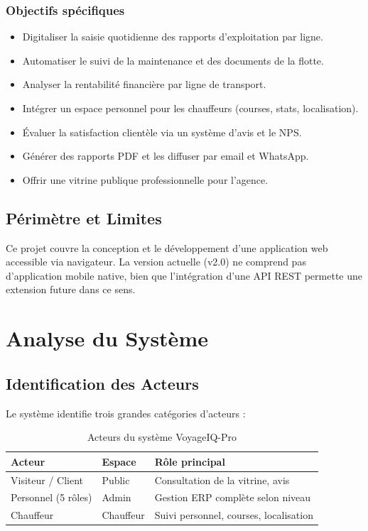 \documentclass[12pt,a4paper]{report}
\begin{document}
\subsection{Objectifs spécifiques}
\begin{itemize}[leftmargin=1.5cm]
    \item Digitaliser la saisie quotidienne des rapports d'exploitation par ligne.
    \item Automatiser le suivi de la maintenance et des documents de la flotte.
    \item Analyser la rentabilité financière par ligne de transport.
    \item Intégrer un espace personnel pour les chauffeurs (courses, stats, localisation).
    \item Évaluer la satisfaction clientèle via un système d'avis et le NPS.
    \item Générer des rapports PDF et les diffuser par email et WhatsApp.
    \item Offrir une vitrine publique professionnelle pour l'agence.
\end{itemize}

\section{Périmètre et Limites}

Ce projet couvre la conception et le développement d'une application web accessible
via navigateur. La version actuelle (v2.0) ne comprend pas d'application mobile native,
bien que l'intégration d'une API REST permette une extension future dans ce sens.

\chapter{Analyse du Système}

\section{Identification des Acteurs}

Le système identifie trois grandes catégories d'acteurs :

\begin{table}[h!]
\centering
\caption{Acteurs du système VoyageIQ-Pro}
\begin{tabularx}{\textwidth}{llX}
\toprule
\textbf{Acteur} & \textbf{Espace} & \textbf{Rôle principal} \\
\midrule
Visiteur / Client   & Public      & Consultation de la vitrine, avis \\
Personnel (5 rôles) & Admin       & Gestion ERP complète selon niveau \\
Chauffeur           & Chauffeur   & Suivi personnel, courses, localisation \\
\bottomrule
\end{tabularx}
\end{table}
\end{document}
